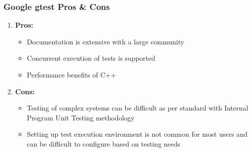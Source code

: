 \documentclass[xcolor]{beamer}
\begin{document}
\begin{frame}
	\frametitle{Google gtest Pros \& Cons}
	\begin{enumerate}
		\item \textbf{Pros:}
		\begin{itemize}
			\item Documentation is extensive with a large community
			\item Concurrent execution of tests is supported
			\item Performance benefits of C++
		\end{itemize}
			\pause
		\item \textbf{Cons:}
		\begin{itemize}
			\item Testing of complex systems can be difficult as per standard with Internal Program Unit Testing methodology
			\item Setting up test execution environment is not common for most users and can be difficult to configure based on testing needs
		\end{itemize}
	\end{enumerate}
\end{frame}
\end{document}
